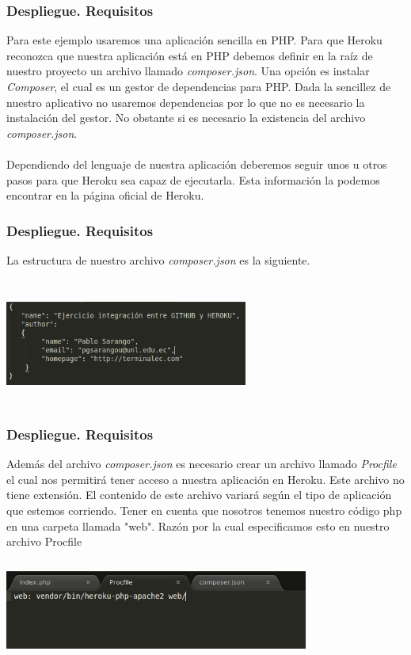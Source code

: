 \documentclass{beamer}
\begin{document}
\begin{frame}
\frametitle{Despliegue. Requisitos}
Para este ejemplo usaremos una aplicación sencilla en PHP. Para que Heroku reconozca que nuestra aplicación está en PHP debemos definir en la raíz de nuestro proyecto un archivo llamado \textit{composer.json}. Una opción es instalar \textit{Composer}, el cual es un gestor de dependencias para PHP. Dada la sencillez de nuestro aplicativo no usaremos dependencias por lo que no es necesario la instalación del gestor. No obstante si es necesario la existencia del archivo \textit{composer.json}.\\ \ \\
Dependiendo del lenguaje de nuestra aplicación deberemos seguir unos u otros pasos para que Heroku sea capaz de ejecutarla. Esta información la podemos encontrar en la página oficial de Heroku.
\end{frame}

\begin{frame}
\frametitle{Despliegue. Requisitos}
La estructura de nuestro archivo \textit{composer.json} es la siguiente.\\ \ \\
\centering
\includegraphics[width=8cm, height=4cm]{githubHeroku/26.png}
\end{frame}

\begin{frame}
\frametitle{Despliegue. Requisitos}
Además del archivo \textit{composer.json} es necesario crear un archivo llamado \textit{Procfile} el cual nos permitirá tener acceso a nuestra aplicación en Heroku. Este archivo no tiene extensión. El contenido de este archivo variará según el tipo de aplicación que estemos corriendo. Tener en cuenta que nosotros tenemos nuestro código php en una carpeta llamada "web". Razón por la cual especificamos esto en nuestro archivo Procfile\\ \ \\
\centering
\includegraphics[width=10cm, height=3cm]{githubHeroku/32.png}
\end{frame}
\end{document}
